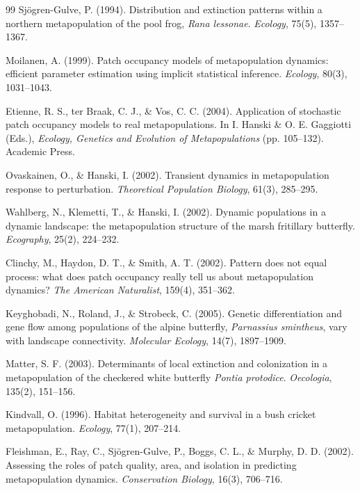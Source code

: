 \documentclass[11pt,a4paper]{article}
\begin{document}
\begin{thebibliography}{99}
Sj\"ogren-Gulve, P. (1994). Distribution and extinction patterns within a northern metapopulation of the pool frog, \textit{Rana lessonae}. \textit{Ecology}, 75(5), 1357--1367.

Moilanen, A. (1999). Patch occupancy models of metapopulation dynamics: efficient parameter estimation using implicit statistical inference. \textit{Ecology}, 80(3), 1031--1043.

Etienne, R. S., ter Braak, C. J., \& Vos, C. C. (2004). Application of stochastic patch occupancy models to real metapopulations. In I. Hanski \& O. E. Gaggiotti (Eds.), \textit{Ecology, Genetics and Evolution of Metapopulations} (pp. 105--132). Academic Press.

Ovaskainen, O., \& Hanski, I. (2002). Transient dynamics in metapopulation response to perturbation. \textit{Theoretical Population Biology}, 61(3), 285--295.

Wahlberg, N., Klemetti, T., \& Hanski, I. (2002). Dynamic populations in a dynamic landscape: the metapopulation structure of the marsh fritillary butterfly. \textit{Ecography}, 25(2), 224--232.

Clinchy, M., Haydon, D. T., \& Smith, A. T. (2002). Pattern does not equal process: what does patch occupancy really tell us about metapopulation dynamics? \textit{The American Naturalist}, 159(4), 351--362.

Keyghobadi, N., Roland, J., \& Strobeck, C. (2005). Genetic differentiation and gene flow among populations of the alpine butterfly, \textit{Parnassius smintheus}, vary with landscape connectivity. \textit{Molecular Ecology}, 14(7), 1897--1909.

Matter, S. F. (2003). Determinants of local extinction and colonization in a metapopulation of the checkered white butterfly \textit{Pontia protodice}. \textit{Oecologia}, 135(2), 151--156.

Kindvall, O. (1996). Habitat heterogeneity and survival in a bush cricket metapopulation. \textit{Ecology}, 77(1), 207--214.

Fleishman, E., Ray, C., Sj\"ogren-Gulve, P., Boggs, C. L., \& Murphy, D. D. (2002). Assessing the roles of patch quality, area, and isolation in predicting metapopulation dynamics. \textit{Conservation Biology}, 16(3), 706--716.

\end{thebibliography}
\end{document}
